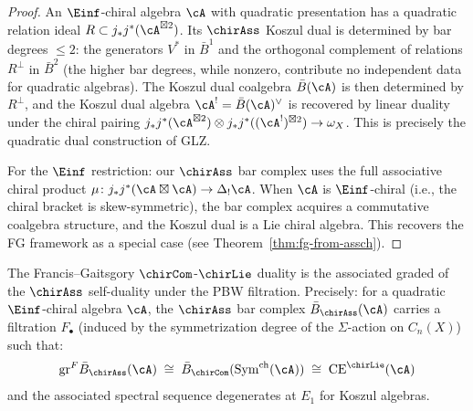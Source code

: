 \begin{proof}
An $\Einf$-chiral algebra $\cA$ with quadratic presentation has a quadratic relation ideal $R \subset j_*j^*(\cA^{\boxtimes 2})$.  Its $\chirAss$ Koszul dual is determined by bar degrees $\leq 2$: the generators $V^*$ in $\bar{B}^1$ and the orthogonal complement of relations $R^\perp$ in $\bar{B}^2$ (the higher bar degrees, while nonzero, contribute no independent data for quadratic algebras).  The Koszul dual coalgebra $\bar{B}(\cA)$ is then determined by $R^\perp$, and the Koszul dual algebra $\cA^! = \bar{B}(\cA)^\vee$ is recovered by linear duality under the chiral pairing $j_*j^*(\cA^{\boxtimes 2}) \otimes j_*j^*((\cA^!)^{\boxtimes 2}) \to \omega_X$.  This is precisely the quadratic dual construction of GLZ.

For the $\Einf$ restriction: our $\chirAss$ bar complex uses the full associative chiral product $\mu\colon j_*j^*(\cA \boxtimes \cA) \to \Delta_!\cA$.  When $\cA$ is $\Einf$-chiral (i.e., the chiral bracket is skew-symmetric), the bar complex acquires a commutative coalgebra structure, and the Koszul dual is a Lie chiral algebra.  This recovers the FG framework as a special case (see Theorem~\ref{thm:fg-from-assch}).
\end{proof}

\begin{theorem}\label{thm:fg-from-assch}
The Francis--Gaitsgory $\chirCom$-$\chirLie$ duality is the associated graded of the $\chirAss$ self-duality under the PBW filtration.  Precisely: for a quadratic $\Einf$-chiral algebra $\cA$, the $\chirAss$ bar complex $\bar{B}_{\chirAss}(\cA)$ carries a filtration $F_\bullet$ (induced by the symmetrization degree of the $\Sigma$-action on $C_n(X)$) such that:
\begin{equation}\label{eq:fg-from-assch}
\mathrm{gr}^F \bar{B}_{\chirAss}(\cA) \;\cong\; \bar{B}_{\chirCom}(\mathrm{Sym}^{\mathrm{ch}}(\cA)) \;\cong\; \mathrm{CE}^{\chirLie}(\cA)
\end{equation}
and the associated spectral sequence degenerates at $E_1$ for Koszul algebras.
\end{theorem}

